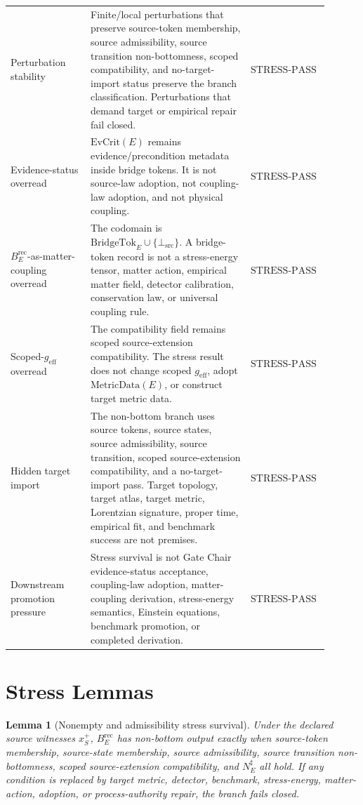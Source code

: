 \documentclass[11pt]{article}
\newcommand{\geff}{g_{\mathrm{eff}}}
\newcommand{\MetricData}{\mathrm{MetricData}}
\newcommand{\EvCrit}{\mathrm{EvCrit}}
\newcommand{\BottomSrc}{\bot_{\mathrm{src}}}
\newcommand{\BridgeTok}{\mathrm{BridgeTok}}
\newcommand{\BErec}{B_E^{\mathrm{rec}}}
\newcommand{\StressPass}{\mathrm{STRESS}\mbox{-}\mathrm{PASS}}
\newtheorem{lemma}{Lemma}
\begin{document}
\begin{longtable}{p{0.24\linewidth}p{0.48\linewidth}p{0.18\linewidth}}
\addlinespace
Perturbation stability &
Finite/local perturbations that preserve source-token membership, source
admissibility, source transition non-bottomness, scoped compatibility, and
no-target-import status preserve the branch classification. Perturbations
that demand target or empirical repair fail closed. & \(\StressPass\) \\
\addlinespace
Evidence-status overread &
\(\EvCrit(E)\) remains evidence/precondition metadata inside bridge tokens.
It is not source-law adoption, not coupling-law adoption, and not physical
coupling. & \(\StressPass\) \\
\addlinespace
\(\BErec\)-as-matter-coupling overread &
The codomain is \(\BridgeTok_E\cup\{\BottomSrc\}\). A bridge-token record is
not a stress-energy tensor, matter action, empirical matter field, detector
calibration, conservation law, or universal coupling rule. & \(\StressPass\) \\
\addlinespace
Scoped-\(\geff\) overread &
The compatibility field remains scoped source-extension compatibility. The
stress result does not change scoped \(\geff\), adopt \(\MetricData(E)\), or
construct target metric data. & \(\StressPass\) \\
\addlinespace
Hidden target import &
The non-bottom branch uses source tokens, source states, source
admissibility, source transition, scoped source-extension compatibility, and a
no-target-import pass. Target topology, target atlas, target metric,
Lorentzian signature, proper time, empirical fit, and benchmark success are
not premises. & \(\StressPass\) \\
\addlinespace
Downstream promotion pressure &
Stress survival is not Gate Chair evidence-status acceptance, coupling-law
adoption, matter-coupling derivation, stress-energy semantics, Einstein
equations, benchmark promotion, or completed derivation. & \(\StressPass\) \\
\bottomrule
\end{longtable}

\section{Stress Lemmas}

\begin{lemma}[Nonempty and admissibility stress survival]
Under the declared source witnesses \(x_S^+\), \(\BErec\) has non-bottom
output exactly when source-token membership, source-state membership, source
admissibility, source transition non-bottomness, scoped source-extension
compatibility, and \(N_E^\sharp\) all hold. If any condition is replaced by
target metric, detector, benchmark, stress-energy, matter-action, adoption, or
process-authority repair, the branch fails closed.
\end{lemma}
\end{document}
